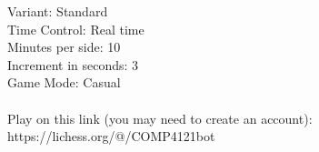 \documentclass[a4paper,12pt]{report}
\begin{document}
Variant: Standard\\
Time Control: Real time\\
Minutes per side: 10\\
Increment in seconds: 3\\
Game Mode: Casual\\\\
Play on this link (you may need to create an account):\\
https://lichess.org/@/COMP4121bot

\tableofcontents







\end{document}
